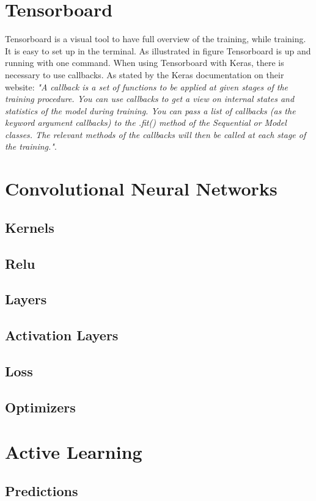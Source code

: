 \documentclass[USenglish]{ifimaster}  %
\begin{document}
\section{Tensorboard}
Tensorboard is a visual tool to have full overview of the training, while training. It is easy to set up in the terminal. As illustrated in figure  Tensorboard is up and running with one command. When using Tensorboard with Keras, there is necessary to use callbacks. As stated by the Keras documentation on their website: \textit{"A callback is a set of functions to be applied at given stages of the training procedure. You can use callbacks to get a view on internal states and statistics of the model during training. You can pass a list of callbacks (as the keyword argument callbacks) to the .fit() method of the Sequential or Model classes. The relevant methods of the callbacks will then be called at each stage of the training."}\cite{website:Keras_doc}.  
\section{Convolutional Neural Networks}
\subsection{Kernels}
\subsection{Relu}
\subsection{Layers}
\subsection{Activation Layers}
\subsection{Loss}
\subsection{Optimizers}
\section{Active Learning}
\subsection{Predictions}
\end{document}
